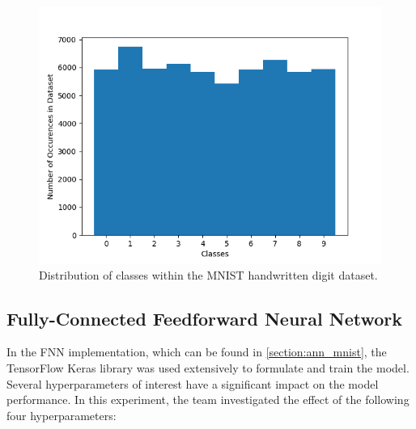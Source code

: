 \documentclass[a4paper]{article}
\begin{document}
\begin{figure}[h!]
    \centering
    \includegraphics[scale=0.5]{images/mnist-class-dist.png}
    \caption{Distribution of classes within the MNIST handwritten digit dataset.}
    \label{fig:mnist-class-dist}
\end{figure}

\subsection{Fully-Connected Feedforward Neural Network} \label{ann_lib}
In the FNN implementation, which can be found in \ref{section:ann_mnist}, the TensorFlow Keras library was used extensively to formulate and train the model. Several hyperparameters of interest have a significant impact on the model performance. In this experiment, the team investigated the effect of the following four hyperparameters:
\end{document}

